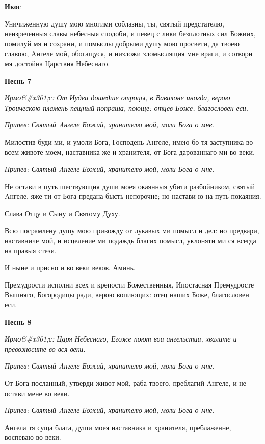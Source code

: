 \bfseries Икос\normalfont{}


Уничиженную душу мою многими соблазны, ты, святый предстателю, неизреченныя славы небесныя сподоби, и певец с лики безплотных сил Божиих, помилуй мя и сохрани, и помыслы добрыми душу мою просвети, да твоею славою, Aнгеле мой, обогащуся, и низложи зломыслящия мне враги, и сотвори мя достойна Царствия Небеснаго.




\bfseries Песнь 7\normalfont{}


\itshape Ирмо&#x301;с:\normalfont{} От Иудеи дошедше отроцы, в Вавилоне иногда, верою Троическою пламень пещный попраша, поюще: отцев Боже, благословен еси.


\itshape Припев:\normalfont{} Святый Aнгеле Божий, хранителю мой, моли Бога о мне.


Милостив буди ми, и умоли Бога, Господень Aнгеле, имею бо тя заступника во всем животе моем, наставника же и хранителя, от Бога дарованнаго ми во веки.


\itshape Припев:\normalfont{} Святый Aнгеле Божий, хранителю мой, моли Бога о мне.


Не остави в путь шествующия души моея окаянныя убити разбойником, святый Aнгеле, яже ти от Бога предана бысть непорочне; но настави ю на путь покаяния.


Слава Отцу и Сыну и Святому Духу.


Всю посрамлену душу мою привожду от лукавых ми помысл и дел: но предвари, наставниче мой, и исцеление ми подаждь благих помысл, уклоняти ми ся всегда на правыя стези.


И ныне и присно и во веки веков. Аминь.


Премудрости исполни всех и крепости Божественныя, Ипостасная Премудросте Вышняго, Богородицы ради, верою вопиющих: отец наших Боже, благословен еси.




\bfseries Песнь 8\normalfont{}


\itshape Ирмо&#x301;с:\normalfont{} Царя Небеснаго, Егоже поют вои ангельстии, хвалите и превозносите во вся веки.


\itshape Припев:\normalfont{} Святый Aнгеле Божий, хранителю мой, моли Бога о мне.


От Бога посланный, утверди живот мой, раба твоего, преблагий Aнгеле, и не остави мене во веки.


\itshape Припев:\normalfont{} Святый Aнгеле Божий, хранителю мой, моли Бога о мне.


Ангела тя суща блага, души моея наставника и хранителя, преблаженне, воспеваю во веки.



